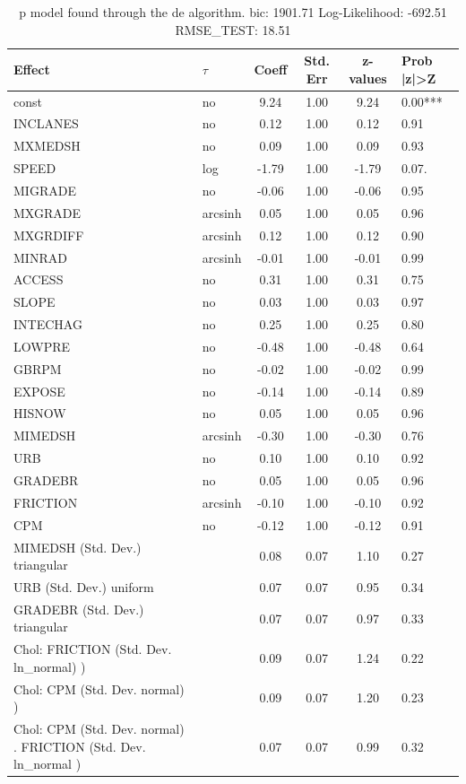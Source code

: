 \begin{table}
	\caption{p model found through the de algorithm. bic: 1901.71 Log-Likelihood: -692.51 RMSE_TEST: 18.51}
	\begin{center}
		\begin{tabular}{|l|l|c|c|c|l|}
			\hline
			Effect & $\tau$ & Coeff & Std. Err & z-values & Prob |z|>Z \\
			\hline
			const & no & 9.24 & 1.00 & 9.24 & 0.00*** \\
			\hline
			INCLANES & no & 0.12 & 1.00 & 0.12 & 0.91 \\
			\hline
			MXMEDSH & no & 0.09 & 1.00 & 0.09 & 0.93 \\
			\hline
			SPEED & log & -1.79 & 1.00 & -1.79 & 0.07. \\
			\hline
			MIGRADE & no & -0.06 & 1.00 & -0.06 & 0.95 \\
			\hline
			MXGRADE & arcsinh & 0.05 & 1.00 & 0.05 & 0.96 \\
			\hline
			MXGRDIFF & arcsinh & 0.12 & 1.00 & 0.12 & 0.90 \\
			\hline
			MINRAD & arcsinh & -0.01 & 1.00 & -0.01 & 0.99 \\
			\hline
			ACCESS & no & 0.31 & 1.00 & 0.31 & 0.75 \\
			\hline
			SLOPE & no & 0.03 & 1.00 & 0.03 & 0.97 \\
			\hline
			INTECHAG & no & 0.25 & 1.00 & 0.25 & 0.80 \\
			\hline
			LOWPRE & no & -0.48 & 1.00 & -0.48 & 0.64 \\
			\hline
			GBRPM & no & -0.02 & 1.00 & -0.02 & 0.99 \\
			\hline
			EXPOSE & no & -0.14 & 1.00 & -0.14 & 0.89 \\
			\hline
			HISNOW & no & 0.05 & 1.00 & 0.05 & 0.96 \\
			\hline
			MIMEDSH & arcsinh & -0.30 & 1.00 & -0.30 & 0.76 \\
			\hline
			URB & no & 0.10 & 1.00 & 0.10 & 0.92 \\
			\hline
			GRADEBR & no & 0.05 & 1.00 & 0.05 & 0.96 \\
			\hline
			FRICTION & arcsinh & -0.10 & 1.00 & -0.10 & 0.92 \\
			\hline
			CPM & no & -0.12 & 1.00 & -0.12 & 0.91 \\
			\hline
			MIMEDSH (Std. Dev.) triangular &  & 0.08 & 0.07 & 1.10 & 0.27 \\
			\hline
			URB (Std. Dev.) uniform &  & 0.07 & 0.07 & 0.95 & 0.34 \\
			\hline
			GRADEBR (Std. Dev.) triangular &  & 0.07 & 0.07 & 0.97 & 0.33 \\
			\hline
			 Chol: FRICTION (Std. Dev. ln_normal) ) &  & 0.09 & 0.07 & 1.24 & 0.22 \\
			\hline
			 Chol: CPM (Std. Dev. normal) ) &  & 0.09 & 0.07 & 1.20 & 0.23 \\
			\hline
			 Chol: CPM (Std. Dev. normal) . FRICTION (Std. Dev.   ln_normal ) &  & 0.07 & 0.07 & 0.99 & 0.32 \\
			\hline
		\end{tabular}
	\end{center}
\end{table}